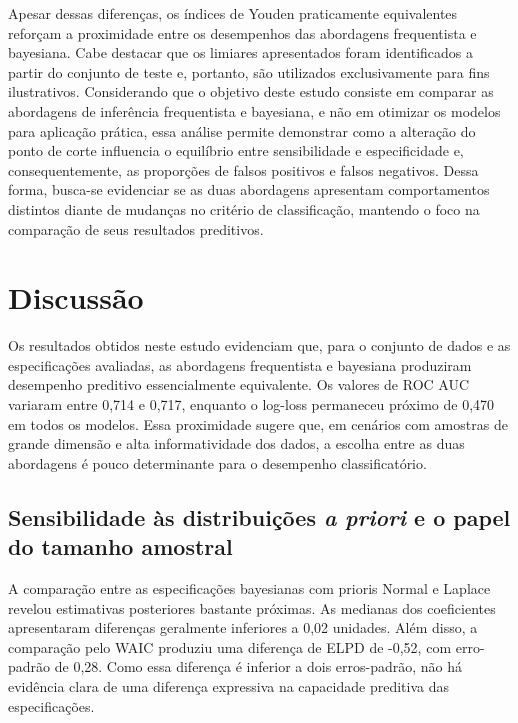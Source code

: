 \documentclass[
  brazilian,
  12pt,
  letterpaper,
  DIV=11,
  numbers=noendperiod]{scrartcl}
\begin{document}
Apesar dessas diferenças, os índices de Youden praticamente equivalentes
reforçam a proximidade entre os desempenhos das abordagens frequentista
e bayesiana. Cabe destacar que os limiares apresentados foram
identificados a partir do conjunto de teste e, portanto, são utilizados
exclusivamente para fins ilustrativos. Considerando que o objetivo deste
estudo consiste em comparar as abordagens de inferência frequentista e
bayesiana, e não em otimizar os modelos para aplicação prática, essa
análise permite demonstrar como a alteração do ponto de corte influencia
o equilíbrio entre sensibilidade e especificidade e, consequentemente,
as proporções de falsos positivos e falsos negativos. Dessa forma,
busca-se evidenciar se as duas abordagens apresentam comportamentos
distintos diante de mudanças no critério de classificação, mantendo o
foco na comparação de seus resultados preditivos.

\section{Discussão}\label{discussuxe3o}

Os resultados obtidos neste estudo evidenciam que, para o conjunto de
dados e as especificações avaliadas, as abordagens frequentista e
bayesiana produziram desempenho preditivo essencialmente equivalente. Os
valores de ROC AUC variaram entre 0,714 e 0,717, enquanto o log-loss
permaneceu próximo de 0,470 em todos os modelos. Essa proximidade sugere
que, em cenários com amostras de grande dimensão e alta informatividade
dos dados, a escolha entre as duas abordagens é pouco determinante para
o desempenho classificatório.

\subsection{\texorpdfstring{Sensibilidade às distribuições \emph{a
priori} e o papel do tamanho
amostral}{Sensibilidade às distribuições a priori e o papel do tamanho amostral}}\label{sensibilidade-uxe0s-distribuiuxe7uxf5es-a-priori-e-o-papel-do-tamanho-amostral}

A comparação entre as especificações bayesianas com prioris Normal e
Laplace revelou estimativas posteriores bastante próximas. As medianas
dos coeficientes apresentaram diferenças geralmente inferiores a 0,02
unidades. Além disso, a comparação pelo WAIC produziu uma diferença de
ELPD de -0,52, com erro-padrão de 0,28. Como essa diferença é inferior a
dois erros-padrão, não há evidência clara de uma diferença expressiva na
capacidade preditiva das especificações.
\end{document}
